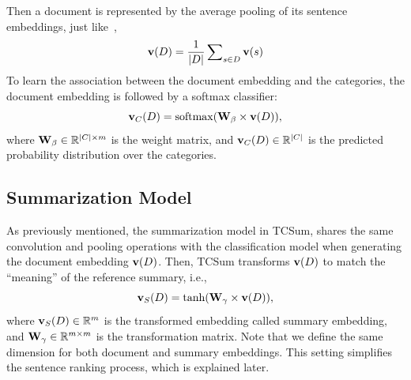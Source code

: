 \documentclass[letterpaper]{article}
\begin{document}
Then a document is represented by the average pooling of its sentence embeddings, just like~\cite{lai2015recurrent},
\begin{equation} \label{eq:documentEmbedding}
{\bf{v}}(D) = \frac{1}{{|D|}}\sum\nolimits_{s \in D} {{\bf{v}}(s)} 
\end{equation}
To learn the association between the document embedding and the categories, the document embedding is followed by a softmax classifier:
\begin{equation}\label{eq:classification}
{\bf{v}}_C(D) = {\rm{softmax}}({{\bf{W}}_\beta} \times {\bf{v}}(D)),
\end{equation}
where ${{\bf{W}}_\beta} \in \mathbb{R}^{|C| \times m}$ is the weight matrix, and ${\bf{v}}_C(D) \in \mathbb{R}^{|C|}$ is the predicted probability distribution over the categories.




\subsection{Summarization Model}
As previously mentioned, the summarization model in TCSum, shares the same convolution and pooling operations with the classification model when generating the document embedding ${\bf{v}}(D)$.
Then, TCSum transforms ${\bf{v}}(D)$ to match the ``meaning'' of the reference summary, i.e.,
\begin{equation}
{\bf{v}}_S(D) = {\rm{tanh}}({{\bf{W}}_\gamma} \times {\bf{v}}(D)),
\end{equation}
where ${\bf{v}}_S(D) \in \mathbb{R}^m$ is the transformed embedding called summary embedding, and ${\bf{W}}_\gamma \in \mathbb{R}^{m \times m}$ is the transformation matrix.
Note that we define the same dimension for both document and summary embeddings.
This setting simplifies the sentence ranking process, which is explained later.
\end{document}
